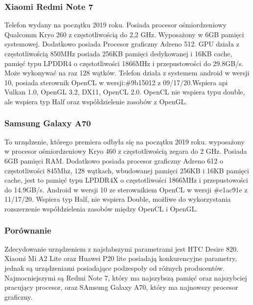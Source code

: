 \subsubsection[Xiaomi Redmi Note 7]{Xiaomi Redmi Note 7}
Telefon wydany na początku 2019 roku. Posiada procesor ośmiordzeniowy Qualcomm Kryo 260 z częstotliwością do 2,2 GHz. Wyposażony w 6GB pamięci systemowej. Dodatkowo posiada Procesor graficzny Adreno 512. GPU działa z częstotliwością 850MHz posiada 256KB pamięci dedykowanej i 16KB cache, pamięć typu LPDDR4 o częstotliwości 1866MHz i przepustowości do 29.8GB/s. Może wykonywać na raz 128 wątków. Telefon działa z systemem android w wersji 10, posiada sterownik OpenCL w wersji:\#9b15012 z 09/17/20.Wspiera api Vulkan 1.0, OpenGL 3.2, DX11, OpenCL 2.0. OpenCL nie wspiera typu double, ale wspiera typ Half oraz współdzielenie zasobów z OpenGL.
\subsubsection[Samsung Galaxy A70]{Samsung Galaxy A70}
To urządzenie, którego premiera odbyła się na początku 2019 roku. wyposażony w procesor ośmiordzeniowy Kryo 460 z częstotliwością zegara do 2 GHz. Posiada 6GB pamięci RAM. Dodatkowo posiada procesor graficzny Adreno 612 o częstotliwości 845Mhz, 128 wątkach, wbudowanej pamięci 256KB i 16KB pamięci cache, jest to pamięć typu LPDDR4X o częstotliwości 1866MHz i przepustowości do 14.9GB/s. Android w wersji 10 ze sterownikiem OpenCL w wersji \#e1ac91e z 11/17/20. Wspiera typ Half, nie wspiera Double, możliwe do wykorzystania rozszerzenie współdzielenia zasobów między OpenCL i OpenGL.
\subsubsection[Porównanie]{Porównanie}
Zdecydowanie urządzeniem z najsłabszymi parametrami jest HTC Desire 820. Xiaomi Mi A2 Lite oraz Huawei P20 lite posiadają konkurencyjne parametry, jednak są urządzeniami posiadające podzespoły od różnych producentów. Najmocniejszymi są Redmi Note 7, który ma najszybszą pamięć oraz najszybciej pracujący procesor, oraz SAmsung Galaxy A70, który ma najnowszy procesor graficzny.

